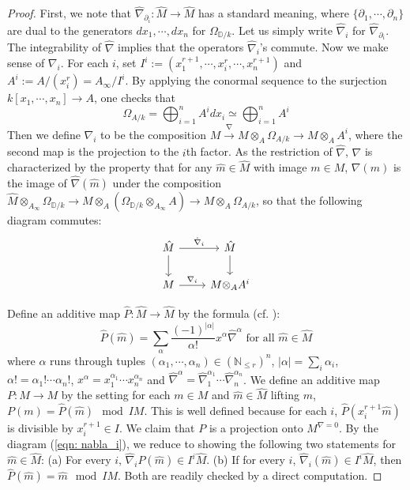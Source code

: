 \documentclass[letter, 11pt]{article}
\theoremstyle{plain}
\theoremstyle{definition}
\newcommand{\ID}{\mathbb{D}}
\newcommand{\IN}{\mathbb{N}}
\newcommand\tensor{{\otimes}}
\newcommand{\<}{\langle}
\renewcommand{\>}{\rangle}
\newcommand{\p}{\partial}
\begin{document}
\begin{proof}
First, we note that $\hat{\nabla}_{\p_i} : \hat{M} \to \hat{M}$ has a standard meaning, where $\{\p_1, \cdots, \p_n\}$ are dual to the generators $dx_1, \cdots, dx_n$ for $\Omega_{\ID / k}$. Let us simply write $\hat{\nabla}_i$ for $\hat{\nabla}_{\p_i}$. The integrability of $\hat{\nabla}$ implies that the operators $\hat{\nabla}_i$'s commute. Now we make sense of $\nabla_i$. For each $i$, set $I^i := (x_1^{r + 1}, \cdots, x_i^{r}, \cdots, x_n^{r + 1})$ and $A^i := A / (x_i^{r}) = A_\infty / I^i$. By applying the conormal sequence to the surjection $k[x_1, \cdots, x_n] \to A$, one checks that 
$$\Omega_{A/ k} = \bigoplus_{i = 1}^n  A^{i} dx_i \simeq \bigoplus_{i = 1}^n  A^{i} $$
Then we define $\nabla_i$ to be the composition $M \stackrel{\nabla}{\to} M \tensor_A \Omega_{A/k} \to M \tensor_A A^{i}$, where the second map is the projection to the $i$th factor. As the restriction of $\hat{\nabla}$, $\nabla$ is characterized by the property that for any $\hat{m} \in \hat{M}$ with image $m \in M$, $\nabla(m)$ is the image of $\hat{\nabla}(\hat{m})$ under the composition $\hat{M} \tensor_{A_\infty} \Omega_{\ID/k} \to M \tensor_A (\Omega_{\ID/k} \tensor_{A_\infty} A) \to M \tensor_A \Omega_{A/k}$, so that the following diagram commutes: 
\begin{equation}
\label{eqn: nabla_i}
\begin{tikzcd}
	{\hat{M}} & {\hat{M}} \\
	M & M \tensor_A A^i
	\arrow["{\hat{\nabla}_{i}}", from=1-1, to=1-2]
	\arrow[from=1-1, to=2-1]
	\arrow["{\nabla_{i}}", from=2-1, to=2-2]
	\arrow[from=1-2, to=2-2]
\end{tikzcd}    
\end{equation}


Define an additive map $\hat{P} : \hat{M} \to \hat{M}$ by the formula (cf. \cite[(5.1.2)]{Katz}): 
\begin{equation}
    \label{eqn: Katz}
    \hat{P}(\hat{m}) = \sum_{\alpha} \frac{(-1)^{|\alpha|}}{\alpha!} x^\alpha \hat{\nabla}^\alpha \text{ for all } \hat{m} \in \hat{M}
\end{equation}
where $\alpha$ runs through tuples $(\alpha_1, \cdots, \alpha_n) \in (\IN_{\le r})^{n}$, $|\alpha| = \sum_i \alpha_i$, $\alpha! = \alpha_1! \cdots \alpha_n!$, $x^\alpha = x_1^{\alpha_1} \cdots x_n^{\alpha_n}$ and $\hat{\nabla}^\alpha = \hat{\nabla}^{\alpha_1}_1 \cdots \hat{\nabla}^{\alpha_n}_n$. We define an additive map $P : M \to M$ by the setting for each $m \in M$ and $\hat{m} \in \hat{M}$ lifting $m$, $P(m) = \hat{P}(\hat{m}) \mod IM$. This is well defined because for each $i$, $\hat{P}(x_i^{r + 1} \hat{m})$ is divisible by $x_i^{r + 1} \in I$. We claim that $P$ is a projection onto $M^{\nabla = 0}$. By the diagram (\ref{eqn: nabla_i}), we reduce to showing the following two statements for $\hat{m} \in \hat{M}$: (a) For every $i$, $\hat{\nabla}_i P(\hat{m}) \in I^i \hat{M}$. (b) If for every $i$, $\hat{\nabla}_i (\hat{m}) \in I^i \hat{M}$, then $\hat{P}(\hat{m}) = \hat{m} \mod IM$. Both are readily checked by a direct computation. 


\end{proof}
\end{document}
